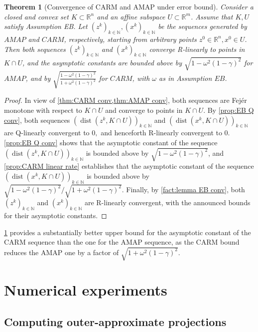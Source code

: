 \documentclass[smallextended,numbook,nospthms]{svjour3}
\theoremstyle{plain}
\newtheorem{theorem}{Theorem}[subsection]
\theoremstyle{definition}
\def\RR{\mathds R}
\def\NN{\mathds N}
\DeclareMathOperator{\dist}{dist}
\begin{document}
\begin{theorem}[Convergence of CARM and AMAP under error bound]\label{thm:CARM EB conv}
	Consider a closed and convex set $K \subset \RR^{n}$ and an affine subspace $U \subset \RR^{m}$. Assume that $K, U$ satisfy Assumption EB. Let $\left(z^{k}\right)_{k \in \NN},\left(x^{k}\right)_{k \in \NN}$ be the sequences generated by $AMAP$ and $CARM$, respectively, starting from arbitrary points $z^{0} \in \RR^{n}, x^{0} \in U$. Then both sequences $\left(z^{k}\right)_{k \in \NN}$ and $\left(x^{k}\right)_{k \in \NN}$
	converge R-linearly to points in $K \cap U$, and the asymptotic constants are bounded above by $\sqrt{1-\omega^{2}(1-\gamma)^{2}}$ for $AMAP$, and by $\sqrt{\frac{1-\omega^{2}(1-\gamma)^{2}}{1+\omega^{2}(1-\gamma)^{2}}}$ for $CARM$, with $\omega$ as in Assumption $EB$.
\end{theorem}
\begin{proof}
	In view of \cref{thm:CARM conv,thm:AMAP conv}, both sequences are Fejér monotone with respect to $K \cap U$ and converge to points in $K \cap U$. By \cref{prop:EB Q conv}, both sequences $\left(\dist\left(z^{k}, K \cap U\right)\right)_{k \in \NN}$ and $\left(\dist\left(x^{k}, K \cap U\right)\right)_{k \in \NN}$ are Q-linearly convergent to $0,$ and henceforth R-linearly convergent to 0. 
	\cref{prop:EB Q conv} shows that the asymptotic constant of the sequence $\left(\dist\left(z^{k}, K \cap U\right)\right)_{k \in \NN}$ is bounded above by $\sqrt{1-\omega^{2}(1-\gamma)^{2}}$, and \cref{prop:CARM linear rate} establishes that the asymptotic constant of the sequence $\left(\dist\left(x^{k}, K \cap U\right)\right)_{k \in \NN}$ is bounded above by $\sqrt{1-\omega^{2}(1-\gamma)^{2}} / \sqrt{1+\omega^{2}(1-\gamma)^{2}}$. Finally, by \cref{fact:lemma EB conv}, both $\left(z^{k}\right)_{k \in \NN}$ and $\left(x^{k}\right)_{k \in \NN}$ are R-linearly convergent, with the announced bounds for their asymptotic constants.
\end{proof}

\cref{thm:CARM EB conv} provides a substantially better upper bound for the asymptotic constant of the CARM sequence than the one for the AMAP sequence, as the CARM bound reduces the AMAP one by a factor of $\sqrt{1+\omega^{2}(1-\gamma)^2}$.

\newpage
\section{Numerical experiments}\label{sec:numerical}
\subsection{Computing outer-approximate projections}
\end{document}
